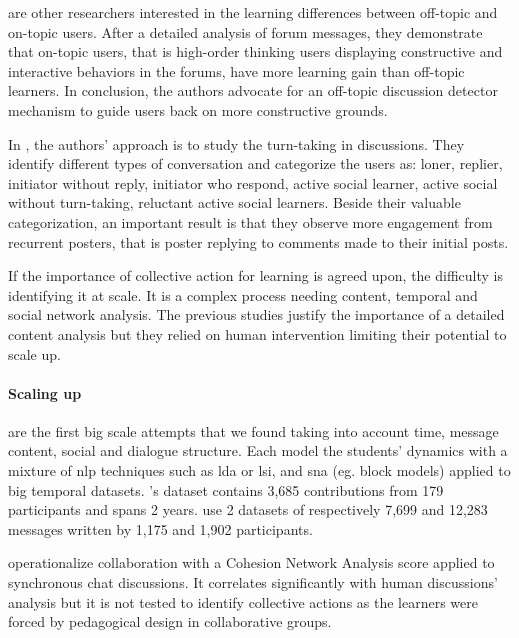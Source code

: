 \documentclass[a4paper,twoside]{article}
\begin{document}
\cite{Wang2016} are other researchers interested in the learning differences between off-topic and on-topic users.  After a detailed analysis of forum messages, they demonstrate that on-topic users, that is high-order thinking users displaying constructive and interactive behaviors in the forums, have more learning gain than off-topic learners.  In conclusion, the authors advocate for an off-topic discussion detector mechanism to guide users back on more constructive grounds.

In \citep{Chua2017}, the authors' approach is to study the turn-taking in discussions.  They identify different types of conversation and categorize the users as: loner, replier, initiator without reply, initiator who respond, active social learner, active social without turn-taking, reluctant active social learners.  Beside their valuable categorization, an important result is that they observe more engagement from recurrent posters, that is poster replying to comments made to their initial posts.

If the importance of collective action for learning is agreed upon, the difficulty is identifying it at scale. It is a complex process needing content, temporal and social network analysis.  The previous studies justify the importance of a detailed content analysis but they relied on human intervention limiting their potential to scale up.

\paragraph{Scaling up}

\cite{Dascalu2017,Boroujeni2017} are the first big scale attempts that we found taking into account time, message content, social and dialogue structure.  Each model the students' dynamics with a mixture of \gls{nlp} techniques such as \gls{lda} or \gls{lsi}, and \gls{sna} (eg.  block models) applied to big temporal datasets.  \cite{Dascalu2017}'s dataset contains 3,685 contributions from 179 participants and spans 2 years.  \cite{Boroujeni2017} use 2 datasets of respectively 7,699 and 12,283 messages written by 1,175 and 1,902 participants.

\cite{Dascalu2017} operationalize collaboration with a Cohesion Network Analysis score applied to synchronous chat discussions.  It correlates significantly with human discussions' analysis but it is not tested to identify collective actions as the learners were forced by pedagogical design in collaborative groups.
\end{document}

